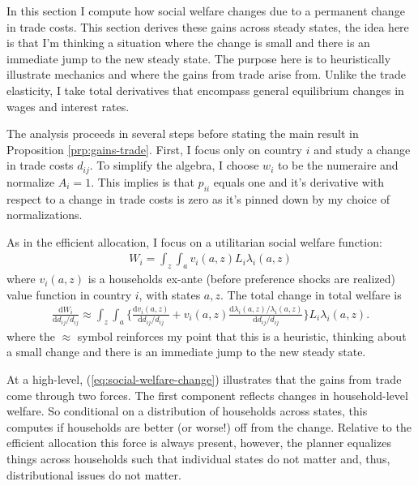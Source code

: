\documentclass[12pt,pdftex]{article}
\begin{document}
\begin{onehalfspacing}
In this section I compute how social welfare changes due to a permanent change in trade costs. This section derives these gains across steady states, the idea here is that I'm thinking a situation where the change is small and there is an immediate jump to the new steady state. The purpose here is to heuristically illustrate mechanics and where the gains from trade arise from. Unlike the trade elasticity, I take total derivatives that encompass general equilibrium changes in wages and interest rates.

The analysis proceeds in several steps before stating the main result in Proposition \ref{prp:gains-trade}. First, I focus only on country $i$ and study a change in trade costs $d_{ij}$. To simplify the algebra, I choose $w_i$ to be the numeraire and normalize $A_i = 1$. This implies is that $p_{ii}$ equals one and it's derivative with respect to a change in trade costs is zero as it's pinned down by my choice of normalizations.

As in the efficient allocation, I focus on a utilitarian social welfare function:
\begin{align}
W_{i} = \int_{z} \int_{a}  v_{i}(a,z) L_i \lambda_{i}(a,z)
\label{eq:apx-social-welfare}
\end{align}
where $v_{i}(a,z)$ is a households ex-ante (before preference shocks are realized) value function in country $i$, with states $a,z$. The total change in total welfare is
\begin{align}
\frac{\mathrm{d} W_{i}}{\mathrm{d} d_{ij} / d_{ij}} \approx \int_{z} \int_{a} \bigg \{ \frac{\mathrm{d} v_i(a, z)}{\mathrm{d} d_{ij} / d_{ij}}  + v_{i}(a,z) \frac{\mathrm{d} \lambda_{i}(a,z)/ \lambda_{i}(a,z)}{\mathrm{d} d_{ij} / d_{ij}}  \bigg \} L_i \lambda_{i}(a,z).
\label{eq:social-welfare-change}
\end{align}
where the $\approx$ symbol reinforces my point that this is a heuristic, thinking about a small change and there is an immediate jump to the new steady state.

At a high-level, (\ref{eq:social-welfare-change}) illustrates that the gains from trade come through two forces. The first component reflects changes in household-level welfare. So conditional on a distribution of households across states, this computes if households are better (or worse!) off from the change. Relative to the efficient allocation this force is always present, however, the planner equalizes things across households such that individual states do not matter and, thus, distributional issues do not matter.


\end{onehalfspacing}
\end{document}
